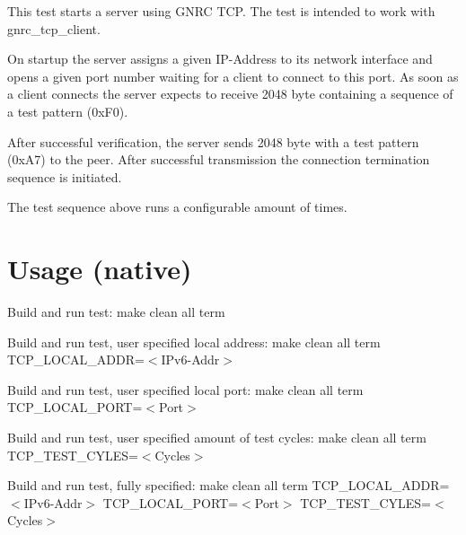 This test starts a server using G\+N\+RC T\+CP. The test is intended to work with gnrc\+\_\+tcp\+\_\+client.

On startup the server assigns a given I\+P-\/\+Address to its network interface and opens a given port number waiting for a client to connect to this port. As soon as a client connects the server expects to receive 2048 byte containing a sequence of a test pattern (0x\+F0).

After successful verification, the server sends 2048 byte with a test pattern (0x\+A7) to the peer. After successful transmission the connection termination sequence is initiated.

The test sequence above runs a configurable amount of times.

\section*{Usage (native) }

Build and run test\+: make clean all term

Build and run test, user specified local address\+: make clean all term T\+C\+P\+\_\+\+L\+O\+C\+A\+L\+\_\+\+A\+D\+DR=$<$I\+Pv6-\/\+Addr$>$

Build and run test, user specified local port\+: make clean all term T\+C\+P\+\_\+\+L\+O\+C\+A\+L\+\_\+\+P\+O\+RT=$<$\+Port$>$

Build and run test, user specified amount of test cycles\+: make clean all term T\+C\+P\+\_\+\+T\+E\+S\+T\+\_\+\+C\+Y\+L\+ES=$<$\+Cycles$>$

Build and run test, fully specified\+: make clean all term T\+C\+P\+\_\+\+L\+O\+C\+A\+L\+\_\+\+A\+D\+DR=$<$I\+Pv6-\/\+Addr$>$ T\+C\+P\+\_\+\+L\+O\+C\+A\+L\+\_\+\+P\+O\+RT=$<$\+Port$>$ T\+C\+P\+\_\+\+T\+E\+S\+T\+\_\+\+C\+Y\+L\+ES=$<$\+Cycles$>$ 